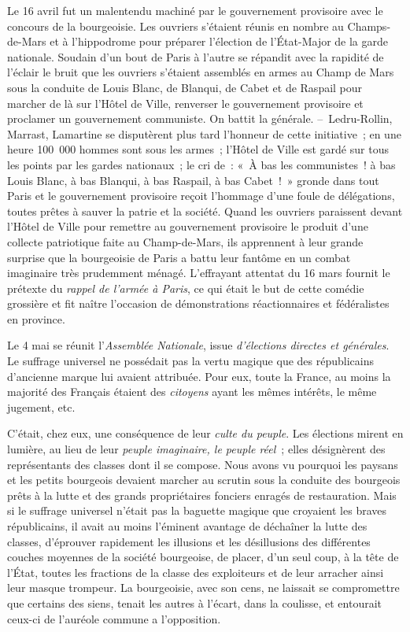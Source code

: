 \documentclass[twoside]{book} %
\begin{document}
Le 16 avril fut un malentendu machiné par le gouvernement provisoire avec le concours de la bourgeoisie. Les ouvriers s’étaient réunis en nombre au Champs-de-Mars et à l’hippodrome pour préparer l’élection de l’État-Major de la garde nationale. Soudain d’un bout de Paris à l’autre se répandit avec la rapidité de l’éclair le bruit que les ouvriers s’étaient assemblés en armes au Champ de Mars sous la conduite de Louis Blanc, de Blanqui, de Cabet et de Raspail pour marcher de là sur l’Hôtel de Ville, renverser le gouvernement provisoire et proclamer un gouvernement communiste. On battit la générale. – Ledru-Rollin, Marrast, Lamartine se disputèrent plus tard l’honneur de cette initiative ; en une heure 100 000 hommes sont sous les armes ; l’Hôtel de Ville est gardé sur tous les points par les gardes nationaux ; le cri de : « À bas les communistes ! à bas Louis Blanc, à bas Blanqui, à bas Raspail, à bas Cabet ! » gronde dans tout Paris et le gouvernement provisoire reçoit l’hommage d’une foule de délégations, toutes prêtes à sauver la patrie et la société. Quand les ouvriers paraissent devant l’Hôtel de Ville pour remettre au gouvernement provisoire le produit d’une collecte patriotique faite au Champ-de-Mars, ils apprennent à leur grande surprise que la bourgeoisie de Paris a battu leur fantôme en un combat imaginaire très prudemment ménagé. L’effrayant attentat du 16 mars fournit le prétexte du \emph{rappel de l’armée à Paris}, ce qui était le but de cette comédie grossière et fit naître l’occasion de démonstrations réactionnaires et fédéralistes en province.\par
Le 4 mai se réunit l’\emph{Assemblée Nationale}, issue \emph{d’élections directes et générales}. Le suffrage universel ne possédait pas la vertu magique que des républicains d’ancienne marque lui avaient attribuée. Pour eux, toute la France, au moins la majorité des Français étaient des \emph{citoyens} ayant les mêmes intérêts, le même jugement, etc.\par
C’était, chez eux, une conséquence de leur \emph{culte du peuple}. Les élections mirent en lumière, au lieu de leur \emph{peuple imaginaire, le peuple réel} ; elles désignèrent des représentants des classes dont il se compose. Nous avons vu pourquoi les paysans et les petits bourgeois devaient marcher au scrutin sous la conduite des bourgeois prêts à la lutte et des grands propriétaires fonciers enragés de restauration. Mais si le suffrage universel n’était pas la baguette magique que croyaient les braves républicains, il avait au moins l’éminent avantage de déchaîner la lutte des classes, d’éprouver rapidement les illusions et les désillusions des différentes couches moyennes de la société bourgeoise, de placer, d’un seul coup, à la tête de l’État, toutes les fractions de la classe des exploiteurs et de leur arracher ainsi leur masque trompeur. La bourgeoisie, avec son cens, ne laissait se compromettre que certains des siens, tenait les autres à l’écart, dans la coulisse, et entourait ceux-ci de l’auréole commune a l’opposition.\par
\end{document}
